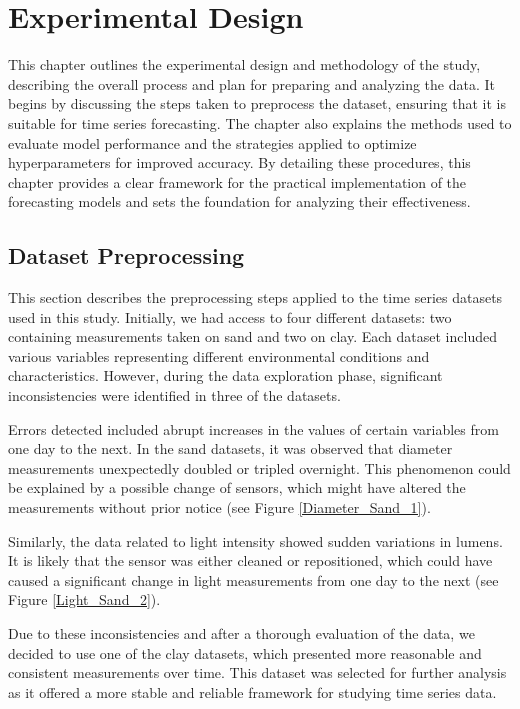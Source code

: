 \chapter{Experimental Design}
\pagestyle{esitscCD}

This chapter outlines the experimental design and methodology of the study, describing the overall process and plan for preparing and analyzing the data. It begins by discussing the steps taken to preprocess the dataset, ensuring that it is suitable for time series forecasting. The chapter also explains the methods used to evaluate model performance and the strategies applied to optimize hyperparameters for improved accuracy. By detailing these procedures, this chapter provides a clear framework for the practical implementation of the forecasting models and sets the foundation for analyzing their effectiveness.

\section{Dataset Preprocessing}

This section describes the preprocessing steps applied to the time series datasets used in this study. Initially, we had access to four different datasets: two containing measurements taken on sand and two on clay. Each dataset included various variables representing different environmental conditions and characteristics. However, during the data exploration phase, significant inconsistencies were identified in three of the datasets.

Errors detected included abrupt increases in the values of certain variables from one day to the next. In the sand datasets, it was observed that diameter measurements unexpectedly doubled or tripled overnight. This phenomenon could be explained by a possible change of sensors, which might have altered the measurements without prior notice (see Figure \ref{Diameter_Sand_1}).

Similarly, the data related to light intensity showed sudden variations in lumens. It is likely that the sensor was either cleaned or repositioned, which could have caused a significant change in light measurements from one day to the next (see Figure \ref{Light_Sand_2}).

Due to these inconsistencies and after a thorough evaluation of the data, we decided to use one of the clay datasets, which presented more reasonable and consistent measurements over time. This dataset was selected for further analysis as it offered a more stable and reliable framework for studying time series data.

